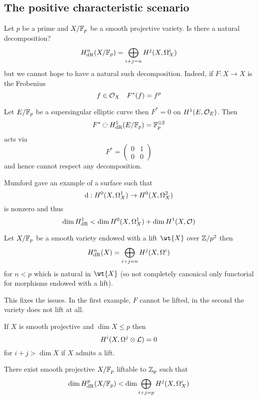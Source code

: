 \documentclass[12pt]{article}
\begin{document}
\subsection{The positive characteristic scenario}

Let $p$ be a prime and $X / \mathbb{F}_p$ be a smooth projective variety. Is there a natural decomposition?
\[ H^n_{\mathrm{dR}}(X / \mathbb{F}_p ) = \bigoplus_{i + j = n} H^j(X, \Omega^i_X) \]
but we cannot hope to have a natural such decomposition. Indeed, if $F : X \to X$ is the Frobenius
\[ f \in \mathcal{O}_{X} \quad F^*(f) = f^p \]

\begin{example}
Let $E / \mathbb{F}_p$ be a supersingular elliptic curve then $F^* = 0$ on $H^1(E, \mathcal{O}_{E})$. Then
\[ F^* \acts H^1_{\dR}(E/\FF_p) = \FF_p^{\oplus 2} \]
acts via
\[ F^* = 
\begin{pmatrix}
0 & 1
\\
0 & 0
\end{pmatrix} \]
and hence cannot respect any decomposition.
\end{example}

\begin{example}
Mumford gave an example of a surface such that 
\[ \mathrm{d} : H^0(X, \Omega_X^1) \to H^0(X, \Omega^2_X) \]
is nonzero and thus
\[ \dim{H^1_{\mathrm{dR}}} < \dim{H^0(X, \Omega_X^1)} + \dim{H^1(X, \mathcal{O}_{})} \]
\end{example}

\begin{theorem}
Let $X / \mathbb{F}_p$ be a smooth variety endowed with a lift $\wt{X}$ over $\mathbb{Z} / p^2$ then 
\[ H^n_{\mathrm{dR}}(X) = \bigoplus_{i + j = n} H^j(X, \Omega^i) \]
for $n < p$ which is natural in $\wt{X}$ (so not completely canonical only functorial for morphisms endowed with a lift). 
\end{theorem}

This fixes the issues. In the first example, $F$ cannot be lifted, in the second the variety does not lift at all. 

\begin{theorem}
If $X$ is smooth projective and $\dim{X} \le p$ then
\[ H^i(X, \Omega^j \otimes \mathcal{L}) = 0 \]
for $i + j > \dim{X}$ if $X$ admits a lift.
\end{theorem}

\begin{theorem}[P]
There exist smooth projective $X / \mathbb{F}_p$ liftable to $\mathbb{Z}_p$ such that
\[ \dim{H_{\mathrm{dR}}^p(X / \mathbb{F}_p)} < \dim \bigoplus_{i + j = p} H^j(X, \Omega^i_X) \]
\end{theorem}
\end{document}

